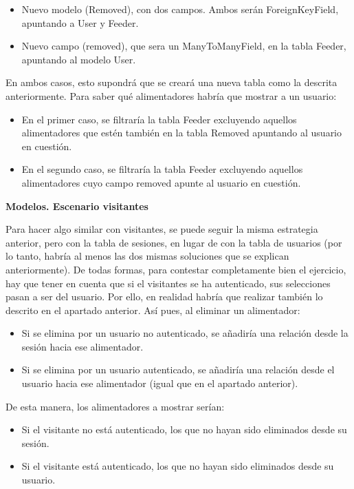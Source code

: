\begin{itemize}
\item Nuevo modelo (Removed), con dos campos. Ambos serán ForeignKeyField, apuntando a User y Feeder.
\item Nuevo campo (removed), que sera un ManyToManyField, en la tabla Feeder, apuntando al modelo User.
\end{itemize}

En ambos casos, esto supondrá que se creará una nueva tabla como la descrita anteriormente. Para saber qué alimentadores habría que mostrar a un usuario:

\begin{itemize}
\item En el primer caso, se filtraría la tabla Feeder excluyendo aquellos alimentadores que estén también en la tabla Removed apuntando al usuario en cuestión.
\item En el segundo caso, se filtraría la tabla Feeder excluyendo aquellos alimentadores cuyo campo removed apunte al usuario en cuestión.
\end{itemize}

\textbf{Modelos. Escenario visitantes}

Para hacer algo similar con visitantes, se puede seguir la misma estrategia anterior, pero con la tabla de sesiones, en lugar de con la tabla de usuarios (por lo tanto, habría al menos las dos mismas soluciones que se explican anteriormente). De todas formas, para contestar completamente bien el ejercicio, hay que tener en cuenta que si el visitantes se ha autenticado, sus selecciones pasan a ser del usuario. Por ello, en realidad habría que realizar también lo descrito en el apartado anterior. Así pues, al eliminar un alimentador:

\begin{itemize}
\item Si se elimina por un usuario no autenticado, se añadiría una relación desde la sesión hacia ese alimentador.
\item Si se elimina por un usuario autenticado, se añadiría una relación desde el usuario hacia ese alimentador (igual que en el apartado anterior).
\end{itemize}

De esta manera, los alimentadores a mostrar serían:

\begin{itemize}
\item Si el visitante no está autenticado, los que no hayan sido eliminados desde su sesión.
\item Si el visitante está autenticado, los que no hayan sido eliminados desde su usuario.
\end{itemize}
  
